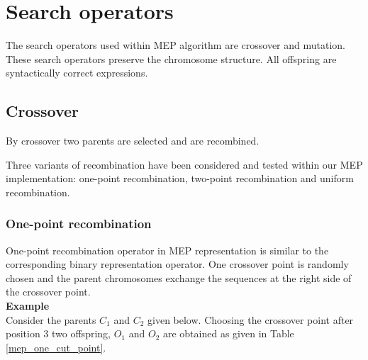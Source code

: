 \documentclass [11pt]{article}
\begin{document}
\section{Search operators}
\label{MEP_Search_operators}

The search operators used within MEP algorithm are crossover and mutation. 
These search operators preserve the chromosome structure. All offspring are 
syntactically correct expressions. 

\subsection{Crossover}

By crossover two parents are selected and are recombined.

Three variants of recombination have been considered and tested within our 
MEP implementation: one-point recombination, two-point recombination and 
uniform recombination.\\

\subsubsection{One-point recombination}

One-point recombination operator in MEP representation is similar to the 
corresponding binary representation operator. One crossover point is 
randomly chosen and the parent chromosomes exchange the sequences at the 
right side of the crossover point.\\

\textbf{Example}\\

Consider the parents $C_{1}$ and $C_{2}$ given below. Choosing the crossover 
point after position 3 two offspring, $O_{1}$ and $O_{2}$ are obtained as 
given in Table \ref{mep_one_cut_point}.
\end{document}
